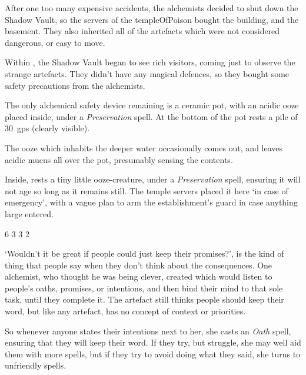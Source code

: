 \begin{multicols}{2}
\showStdSpells[
  \setcounter{diceNo}{0}
]


\begin{exampletext}
  After one too many expensive accidents, the alchemists decided to shut down the Shadow Vault, so the \glspl{server} of the \gls{templeOfPoison} bought the building, and the basement.
  They also inherited all of the \glspl{artefact} which were not considered dangerous, or easy to move.

  Within , the Shadow Vault began to see rich visitors, coming just to observe the strange \glspl{artefact}.
  They didn't have any magical defences, so they bought some safety precautions from the alchemists.
\end{exampletext}

The only alchemical safety device remaining is a ceramic pot, with an acidic ooze placed inside, under a \textit{Preservation} spell.
At the bottom of the pot rests a pile of 30~\glspl{gp} (clearly visible).

The ooze which inhabits the deeper water  occasionally comes out, and leaves acidic mucus all over the pot, presumably sensing the contents.

Inside, rests a tiny little ooze-creature, under a \textit{Preservation} spell, ensuring it will not age so long as it remains still.
The temple \glspl{server} placed it here `in case of emergency', with a vague plan to arm the establishment's guard in case anything large entered.

{6}%
{3}%
{3}%
{2}%


\begin{exampletext}
  `Wouldn't it be great if people could just keep their promises?', is the kind of thing that people say when they don't think about the consequences.
  One alchemist, who thought he was being clever, created  which would listen to people's oaths, promises, or intentions, and then bind their mind to that sole task, until they complete it.
  The \gls{artefact} still thinks people should keep their word, but like any \gls{artefact}, has no concept of context or priorities.

  So whenever anyone states their intentions next to her, she casts an \textit{Oath} spell, ensuring that they will keep their word.
  If they try, but struggle, she may well aid them with more spells, but if they try to avoid doing what they said, she turns to unfriendly spells.


\end{exampletext}
\end{multicols}
